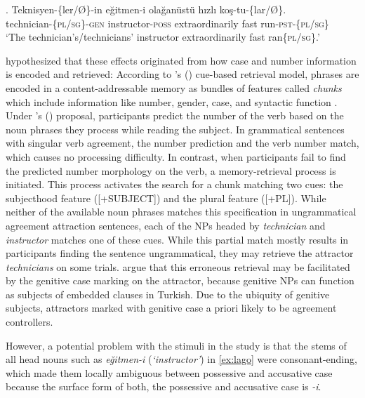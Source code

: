 \documentclass[apacite,linguex]{glossa}\usepackage[]{graphicx}\usepackage[]{color}
\begin{document}
\ex. \label{ex:lago}
\gll Teknisyen-\{ler/\O\}-in e\u{g}itmen-i ola\u{g}an{\"u}st{\"u} h{\i}zl{\i} ko\c{s}-tu-\{lar/\O\}.\\
technician-\{\textsc{pl}/\textsc{sg}\}-\textsc{gen} instructor-\textsc{poss} extraordinarily fast run-\textsc{pst}-\{\textsc{pl}/\textsc{sg}\}\\
\glt `The technician's/technicians' instructor extraordinarily fast ran\{\textsc{pl}/\textsc{sg}\}.'


\citet{LagoEtAl:2019} hypothesized that these effects originated from how case and number information is encoded and retrieved: According to \citeauthor{LewisVasishth:2005}'s (\citeyear{LewisVasishth:2005}) cue-based retrieval model, phrases are encoded in a content-addressable memory as bundles of features called \textit{chunks} which include information like number, gender, case, and syntactic function \citep[e.g.,][]{SmithVasishth:2020}. Under \citeauthor{LagoEtAl:2019}'s (\citeyear{LagoEtAl:2019}) proposal, participants predict the number of the verb based on the noun phrases they process while reading the subject. In grammatical sentences with singular verb agreement, the number prediction and the verb number match, which causes no processing difficulty. In contrast, when participants fail to find the predicted number morphology on the verb, a memory-retrieval process is initiated. This process activates the search for a chunk matching two cues: the subjecthood feature ([+SUBJECT]) and the plural feature ([+PL]). While neither of the available noun phrases matches this specification in ungrammatical agreement attraction sentences, each of the NPs headed by \textit{technician} and \textit{instructor} matches one of these cues. While this partial match mostly results in participants finding the sentence ungrammatical, they may retrieve the attractor \textit{technicians} on some trials. \citet{LagoEtAl:2019} argue that this erroneous retrieval may be facilitated by the genitive case marking on the attractor, because genitive NPs can function as subjects of embedded clauses in Turkish. Due to the ubiquity of genitive subjects, attractors marked with genitive case a priori likely to be agreement controllers.

However, a potential problem with the stimuli in the \citet{LagoEtAl:2019} study is that the stems of all head nouns such as \textit{e\u{g}itmen-i} (\textit{`instructor'}) in \ref{ex:lago} were consonant-ending, which made them locally ambiguous between possessive and accusative case \citep[pp. 66--67]{GokselKerslake:2005} because the surface form of both, the possessive and accusative case is \textit{-i}. 
%
\end{document}
